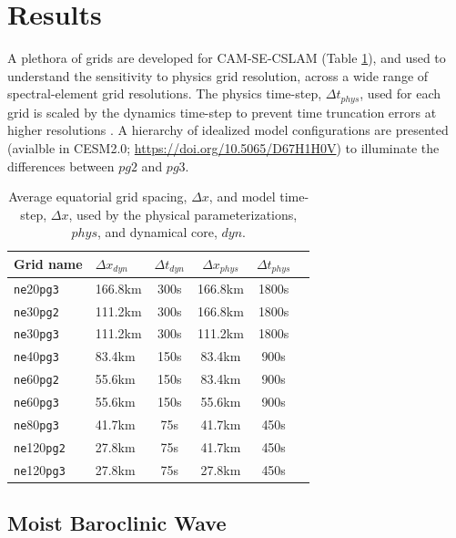 \documentclass{agujournal}
\begin{document}


\section{Results}

A plethora of grids are developed for CAM-SE-CSLAM (Table \ref{table:grids}), and used to understand the sensitivity to physics grid resolution, across a wide range of spectral-element grid resolutions. The physics time-step, $\Delta t_{phys}$, used for each grid is scaled by the dynamics time-step to prevent time truncation errors at higher resolutions \citep{HR2018JAMES}. A hierarchy of idealized model configurations are presented (avialble in CESM2.0; \url{https://doi.org/10.5065/D67H1H0V}) to illuminate the differences between $pg2$ and $pg3$.

 \begin{table}
 \caption{Average equatorial grid spacing, $\Delta x$, and model time-step, $\Delta x$, used by the physical parameterizations, $phys$, and dynamical core, $dyn$.}
 \centering
 \begin{tabular}{llcccc}
 \hline
 Grid name & $\Delta x_{dyn}$  & $\Delta t_{dyn}$ & $\Delta x_{phys}$  & $\Delta t_{phys}$ \\
 \hline
   {\tt{ne}}20{\tt{pg3}}  & 166.8km & 300s  & 166.8km & 1800s \\
   {\tt{ne}}30{\tt{pg2}}  & 111.2km & 300s  & 166.8km & 1800s \\
   {\tt{ne}}30{\tt{pg3}}  & 111.2km & 300s  & 111.2km & 1800s \\
   {\tt{ne}}40{\tt{pg3}}  &  83.4km & 150s  &  83.4km &  900s \\
   {\tt{ne}}60{\tt{pg2}}  &  55.6km & 150s  &  83.4km &  900s \\
   {\tt{ne}}60{\tt{pg3}}  &  55.6km & 150s  &  55.6km &  900s \\
   {\tt{ne}}80{\tt{pg3}}  &  41.7km &  75s  &  41.7km &  450s \\
   {\tt{ne}}120{\tt{pg2}} &  27.8km &  75s  &  41.7km &  450s \\
   {\tt{ne}}120{\tt{pg3}} &  27.8km &  75s  &  27.8km &  450s \\
 \hline
 \end{tabular}
 \label{table:grids}
 \end{table}

\subsection{Moist Baroclinic Wave}
\end{document}
